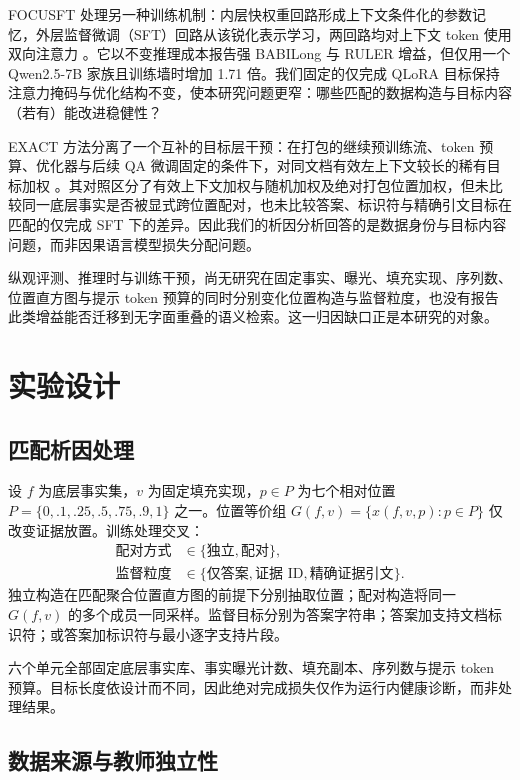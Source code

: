 \documentclass[11pt]{article}
\begin{document}
FOCUSFT 处理另一种训练机制：内层快权重回路形成上下文条件化的参数记忆，外层监督微调（SFT）回路从该锐化表示学习，两回路均对上下文 token 使用双向注意力 \citep{pei2026focusft}。它以不变推理成本报告强 BABILong 与 RULER 增益，但仅用一个 Qwen2.5-7B 家族且训练墙时增加 1.71 倍。我们固定的仅完成 QLoRA 目标保持注意力掩码与优化结构不变，使本研究问题更窄：哪些匹配的数据构造与目标内容（若有）能改进稳健性？

EXACT 方法分离了一个互补的目标层干预：在打包的继续预训练流、token 预算、优化器与后续 QA 微调固定的条件下，对同文档有效左上下文较长的稀有目标加权 \citep{zhu2026exact}。其对照区分了有效上下文加权与随机加权及绝对打包位置加权，但未比较同一底层事实是否被显式跨位置配对，也未比较答案、标识符与精确引文目标在匹配的仅完成 SFT 下的差异。因此我们的析因分析回答的是数据身份与目标内容问题，而非因果语言模型损失分配问题。

纵观评测、推理时与训练干预，尚无研究在固定事实、曝光、填充实现、序列数、位置直方图与提示 token 预算的同时分别变化位置构造与监督粒度，也没有报告此类增益能否迁移到无字面重叠的语义检索。这一归因缺口正是本研究的对象。

\section{实验设计}

\subsection{匹配析因处理}

设 $f$ 为底层事实集，$v$ 为固定填充实现，$p\in P$ 为七个相对位置 $P=\{0,.1,.25,.5,.75,.9,1\}$ 之一。位置等价组 $G(f,v)=\{x(f,v,p):p\in P\}$ 仅改变证据放置。训练处理交叉：
\begin{align*}
\text{配对方式} &\in \{\text{独立},\text{配对}\},\\
\text{监督粒度} &\in \{\text{仅答案},\text{证据 ID},\text{精确证据引文}\}.
\end{align*}
独立构造在匹配聚合位置直方图的前提下分别抽取位置；配对构造将同一 $G(f,v)$ 的多个成员一同采样。监督目标分别为答案字符串；答案加支持文档标识符；或答案加标识符与最小逐字支持片段。

六个单元全部固定底层事实库、事实曝光计数、填充副本、序列数与提示 token 预算。目标长度依设计而不同，因此绝对完成损失仅作为运行内健康诊断，而非处理结果。

\subsection{数据来源与教师独立性}
\end{document}
